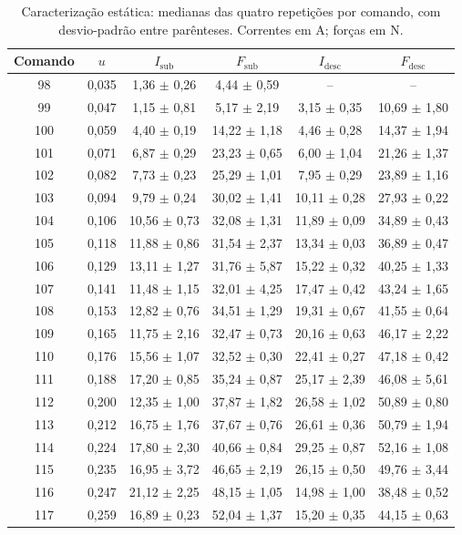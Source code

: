 \begin{table}[htb]
\centering
\caption{Caracterização estática: medianas das quatro repetições por comando, com
desvio-padrão entre parênteses. Correntes em A; forças em N.}
\label{tab:mestra}
\footnotesize
\renewcommand{\arraystretch}{1.2}
\begin{tabular}{c c c c c c}
\hline
Comando & $u$ & $I_\mathrm{sub}$ & $F_\mathrm{sub}$ & $I_\mathrm{desc}$ & $F_\mathrm{desc}$ \\
\hline
98 & 0,035 & 1,36 $\pm$ 0,26 & 4,44 $\pm$ 0,59 & -- & -- \\
99 & 0,047 & 1,15 $\pm$ 0,81 & 5,17 $\pm$ 2,19 & 3,15 $\pm$ 0,35 & 10,69 $\pm$ 1,80 \\
100 & 0,059 & 4,40 $\pm$ 0,19 & 14,22 $\pm$ 1,18 & 4,46 $\pm$ 0,28 & 14,37 $\pm$ 1,94 \\
101 & 0,071 & 6,87 $\pm$ 0,29 & 23,23 $\pm$ 0,65 & 6,00 $\pm$ 1,04 & 21,26 $\pm$ 1,37 \\
102 & 0,082 & 7,73 $\pm$ 0,23 & 25,29 $\pm$ 1,01 & 7,95 $\pm$ 0,29 & 23,89 $\pm$ 1,16 \\
103 & 0,094 & 9,79 $\pm$ 0,24 & 30,02 $\pm$ 1,41 & 10,11 $\pm$ 0,28 & 27,93 $\pm$ 0,22 \\
104 & 0,106 & 10,56 $\pm$ 0,73 & 32,08 $\pm$ 1,31 & 11,89 $\pm$ 0,09 & 34,89 $\pm$ 0,43 \\
105 & 0,118 & 11,88 $\pm$ 0,86 & 31,54 $\pm$ 2,37 & 13,34 $\pm$ 0,03 & 36,89 $\pm$ 0,47 \\
106 & 0,129 & 13,11 $\pm$ 1,27 & 31,76 $\pm$ 5,87 & 15,22 $\pm$ 0,32 & 40,25 $\pm$ 1,33 \\
107 & 0,141 & 11,48 $\pm$ 1,15 & 32,01 $\pm$ 4,25 & 17,47 $\pm$ 0,42 & 43,24 $\pm$ 1,65 \\
108 & 0,153 & 12,82 $\pm$ 0,76 & 34,51 $\pm$ 1,29 & 19,31 $\pm$ 0,67 & 41,55 $\pm$ 0,64 \\
109 & 0,165 & 11,75 $\pm$ 2,16 & 32,47 $\pm$ 0,73 & 20,16 $\pm$ 0,63 & 46,17 $\pm$ 2,22 \\
110 & 0,176 & 15,56 $\pm$ 1,07 & 32,52 $\pm$ 0,30 & 22,41 $\pm$ 0,27 & 47,18 $\pm$ 0,42 \\
111 & 0,188 & 17,20 $\pm$ 0,85 & 35,24 $\pm$ 0,87 & 25,17 $\pm$ 2,39 & 46,08 $\pm$ 5,61 \\
112 & 0,200 & 12,35 $\pm$ 1,00 & 37,87 $\pm$ 1,82 & 26,58 $\pm$ 1,02 & 50,89 $\pm$ 0,80 \\
113 & 0,212 & 16,75 $\pm$ 1,76 & 37,67 $\pm$ 0,76 & 26,61 $\pm$ 0,36 & 50,79 $\pm$ 1,94 \\
114 & 0,224 & 17,80 $\pm$ 2,30 & 40,66 $\pm$ 0,84 & 29,25 $\pm$ 0,87 & 52,16 $\pm$ 1,08 \\
115 & 0,235 & 16,95 $\pm$ 3,72 & 46,65 $\pm$ 2,19 & 26,15 $\pm$ 0,50 & 49,76 $\pm$ 3,44 \\
116 & 0,247 & 21,12 $\pm$ 2,25 & 48,15 $\pm$ 1,05 & 14,98 $\pm$ 1,00 & 38,48 $\pm$ 0,52 \\
117 & 0,259 & 16,89 $\pm$ 0,23 & 52,04 $\pm$ 1,37 & 15,20 $\pm$ 0,35 & 44,15 $\pm$ 0,63 \\
\hline
\end{tabular}
\end{table}

